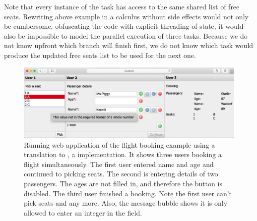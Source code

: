 \begin{example}
Note that every instance of the  task has access to the same shared list of free seats.
Rewriting above example in a calculus without side effects would not only be cumbersome,
obfuscating the code with explicit threading of state,
it would also be impossible to model the parallel execution of three  tasks.
Because we do not know upfront which branch will finish first,
we do not know which task would produce the updated free seats list to be used for the next one.

\end{example}



\begin{figure}[h]
  \includegraphics[width=\columnwidth]{figures/flight-booking.png}
  \caption{
    Running web application of the flight booking example using a translation to \ITASKS,
    a \TOP implementation.
    It shows three users booking a flight simultaneously.
    The first user entered name and age and continued to picking seats.
    The second is entering details of two passengers.
    The ages are not filled in, and therefore the  button is disabled.
    The third user finished a booking.
    Note the first user can't pick seats  and  any more.
    Also, the message bubble shows it is only allowed to enter an integer in the  field.
  }
  \label{fig:flight-booking}
\end{figure}
